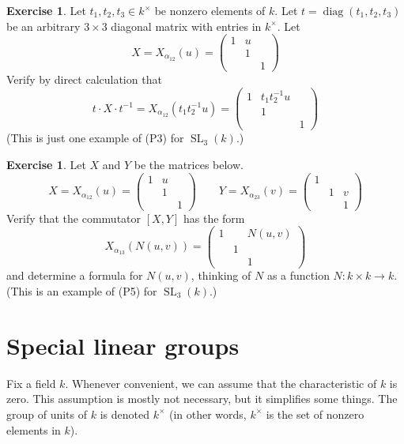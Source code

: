 \documentclass[12pt]{article}
\theoremstyle{definition}
\newtheorem{exercise}[theorem]{Exercise}
\newcommand{\inv}{^{-1}}
\DeclareMathOperator{\SL}{SL}
\DeclareMathOperator{\diag}{diag}
\begin{document}
\begin{exercise}
Let $t_1, t_2, t_3 \in k^\times$ be nonzero elements of $k$. Let $t = \diag(t_1, t_2, t_3)$ be an arbitrary $3 \times 3$ diagonal matrix with entries in $k^\times$. Let
\[
	X = X_{\alpha_{12}}(u) = 
	\begin{pmatrix}
		1 & u \\
		& 1 \\
		&& 1
	\end{pmatrix}
\]
Verify by direct calculation that
\[
	t \cdot X \cdot t \inv = X_{\alpha_{12}}(t_1 t_2 \inv u) = 
	\begin{pmatrix}
		1 & t_1 t_2 \inv u \\
		& 1 \\
		&& 1
	\end{pmatrix}
\]
(This is just one example of (P3) for $\SL_3(k)$.)
\end{exercise}

\begin{exercise}
Let $X$ and $Y$ be the matrices below.
\[
	X = X_{\alpha_{12}}(u) = 
	\begin{pmatrix}
		1 & u \\
		& 1 \\
		&& 1
	\end{pmatrix}
	\qquad
	Y = X_{\alpha_{23}}(v) = 
	\begin{pmatrix}
		1 & \\
		& 1 & v \\
		&& 1
	\end{pmatrix}
\]
Verify that the commutator $[X,Y]$ has the form
\[
	X_{\alpha_{13}}( N(u,v) ) = 
	\begin{pmatrix}
		1 & & N(u,v) \\
		& 1 & \\
		&& 1
	\end{pmatrix}
\]
and determine a formula for $N(u,v)$, thinking of $N$ as a function $N:k \times k \to k$. (This is an example of (P5) for $\SL_3(k)$.)
\end{exercise}

\newpage
\section{Special linear groups}
\label{special linear}

Fix a field $k$. Whenever convenient, we can assume that the characteristic of $k$ is zero. This assumption is mostly not necessary, but it simplifies some things. The group of units of $k$ is denoted $k^\times$ (in other words, $k^\times$ is the set of nonzero elements in $k$).
\end{document}
